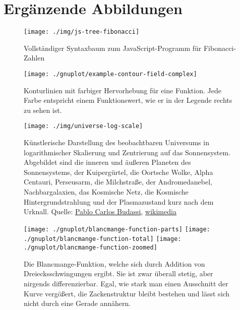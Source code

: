 \chapter{Ergänzende Abbildungen}

\begin{figure}[H]
    \centering
    \texttt{[image: ./img/js-tree-fibonacci]}
    \caption[Vollständiger Syntaxbaum für Fibonacci-Zahlen-Programm]{Vollständiger Syntaxbaum zum JavaScript-Programm für Fibonacci-Zahlen}
    \label{fig:JsFibonacciBaum}
\end{figure}

\begin{figure}[H]
    \centering
    \texttt{[image: ./gnuplot/example-contour-field-complex]}
    \caption[Konturlinien einer komplexen Funktion]{Konturlinien mit farbiger Hervorhebung für eine Funktion. Jede Farbe entspricht einem Funktionswert, wie er in der Legende rechts zu sehen ist.}
    \label{fig:ContourComplexFun}
\end{figure}

\begin{figure}[H]
    \centering
    \texttt{[image: ./img/universe-log-scale]}
    \caption[Künstlerische Darstellung des beobachtbaren Universums in logarithmischer Skalierung]{Künstlerische Darstellung des beobachtbaren Universums in logarithmischer Skalierung und Zentrierung auf das Sonnensystem. Abgebildet sind die inneren und äußeren Planeten des Sonnensystems, der Kuipergürtel, die Oortsche Wolke, Alpha Centauri, Perseusarm, die Milchstraße, der Andromedanebel, Nachbargalaxien, das Kosmische Netz, die Kosmische Hintergrundstrahlung und der Plasmazustand kurz nach dem Urknall. Quelle: \href{https://commons.wikimedia.org/wiki/User:Unmismoobjetivo}{Pablo Carlos Budassi}, \href{https://commons.wikimedia.org/wiki/File:Observable_universe_logarithmic_illustration.png}{wikimedia}}
    \label{fig:UniLogScale}
\end{figure}

\begin{figure}[H]
    \centering
    \texttt{[image: ./gnuplot/blancmange-function-parts]}
    \texttt{[image: ./gnuplot/blancmange-function-total]}
    \texttt{[image: ./gnuplot/blancmange-function-zoomed]}
    \caption[Konstruktion der Blancmange-Funktion]{Die Blancmange-Funktion, welche sich durch Addition von Dreiecksschwingungen ergibt. Sie ist zwar überall stetig, aber nirgends differenzierbar. Egal, wie stark man einen Ausschnitt der Kurve vergößert, die Zackenstruktur bleibt bestehen und lässt sich nicht durch eine Gerade annähern.}
    \label{fig:BlancmangeFunction}
\end{figure}

